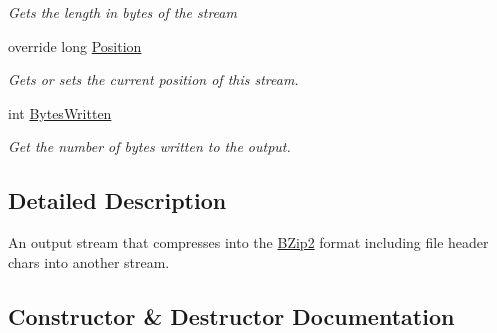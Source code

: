 \begin{DoxyCompactItemize}
\begin{DoxyCompactList}\small\item\em Gets the length in bytes of the stream \end{DoxyCompactList}\item 
override long \hyperlink{class_i_c_sharp_code_1_1_sharp_zip_lib_1_1_b_zip2_1_1_b_zip2_output_stream_ab2611b87dc30402fbad708e340e5c713}{Position}
\begin{DoxyCompactList}\small\item\em Gets or sets the current position of this stream. \end{DoxyCompactList}\item 
int \hyperlink{class_i_c_sharp_code_1_1_sharp_zip_lib_1_1_b_zip2_1_1_b_zip2_output_stream_a297aa48e8cf165b5d4b62cdd02b0b4cb}{Bytes\+Written}
\begin{DoxyCompactList}\small\item\em Get the number of bytes written to the output. \end{DoxyCompactList}\end{DoxyCompactItemize}


\subsection{Detailed Description}
An output stream that compresses into the \hyperlink{namespace_i_c_sharp_code_1_1_sharp_zip_lib_1_1_b_zip2}{B\+Zip2} format including file header chars into another stream. 



\subsection{Constructor \& Destructor Documentation}
\mbox{\label{class_i_c_sharp_code_1_1_sharp_zip_lib_1_1_b_zip2_1_1_b_zip2_output_stream_a3202cc0c622849235c0363339c0943a6}} 

